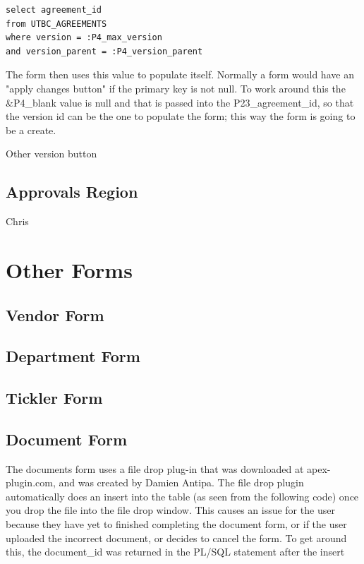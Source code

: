 \documentclass{report}
\begin{document}
\begin{lstlisting}[caption=P4\_max\_agreement query]
select agreement_id 
from UTBC_AGREEMENTS 
where version = :P4_max_version 
and version_parent = :P4_version_parent
\end{lstlisting}

The form then uses this value to populate itself. Normally a form would have an "apply changes button" if the primary key is not null. To work around this the \&P4\_blank value is null and that is passed into the P23\_agreement\_id, so that the version id can be the one to populate the form; this way the form is going to be a create. 

Other version button

\subsection{Approvals Region}
Chris

\section{Other Forms}

\subsection{Vendor Form}

\subsection{Department Form}

\subsection{Tickler Form}

\subsection{Document Form}
The documents form uses a file drop plug-in that was downloaded at apex-plugin.com, and was created by Damien Antipa. The file drop plugin automatically does an insert into the table (as seen from the following code) once you drop the file into the file drop window. This causes an issue for the user because they have yet to finished completing the document form, or if the user uploaded the incorrect document, or decides to cancel the form. To get around this, the document\_id was returned in the PL/SQL statement after the insert
\end{document}
